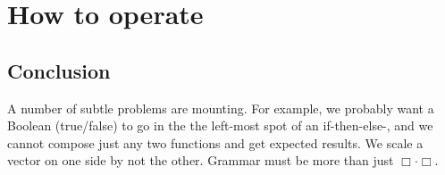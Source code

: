 \chapter{How to operate}








\section*{Conclusion}
A number of subtle problems are 
mounting.  For example, we probably want a Boolean (true/false) to 
go in the the left-most spot of an if-then-else-, and we cannot compose 
just any two functions and get expected results.  We scale a vector on one side 
by not the other.  Grammar must be more than just $\Box\cdot \Box$.

